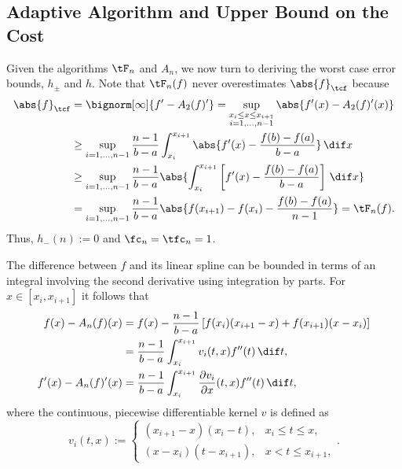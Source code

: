 \documentclass[]{elsarticle}
\theoremstyle{definition}
\theoremstyle{remark}
\newcommand{\Ftnorm}[1]{\abs{#1}_{\tcf}}
\begin{document}
\subsection{Adaptive Algorithm and Upper Bound on the Cost}

Given the algorithms $\tF_n$ and $A_n$, we now turn to deriving the worst case error bounds, $h_{\pm}$  and $h$.
Note that $\tF_{n}(f)$ never overestimates $\Ftnorm{f}$ because
\begin{align*}
\Ftnorm{f} &  = \bignorm[\infty]{f'-A_2(f)'}
= \sup_{\substack{x_i \le x \le x_{i+1}\\ i=1, \ldots, n-1 }} \abs{f'(x) - A_2(f)'(x)} \\
&\ge \sup_{i=1, \ldots, n-1} \frac{n-1}{b-a}\int_{x_i}^{x_{i+1}} \abs{f'(x) - \frac{f(b)-f(a)}{b-a}} \, \dif x \\
&\ge \sup_{i=1, \ldots, n-1} \frac{n-1}{b-a} \abs{\int_{x_i}^{x_{i+1}} \left[f'(x) -\frac{f(b)-f(a)}{b-a}\right] \, \dif x }\\
&= \sup_{i=1, \ldots, n-1} \frac{n-1}{b-a} \abs{f(x_{i+1})-f(x_i) - \frac{f(b)-f(a)}{n-1}} = \tF_n(f).
\end{align*}
Thus, $h_{-}(n):=0$ and $\fc_n=\tfc_n=1$.

The difference between $f$ and its linear spline can be bounded in terms of an integral involving the second derivative using integration by parts.  For $x \in [x_i,x_{i+1}]$ it follows that
\begin{align}
\nonumber
f(x)-A_n (f)(x)
&= f(x) - \frac{n-1}{b-a} \left[f(x_{i})(x_{i+1}-x) +f(x_{i+1})(x-x_i) \right]\\
& = \frac{n-1}{b-a} \int_{x_i}^{x_{i+1}} v_i(t,x) f''(t) \, \dif t, \label{fintermsfdoubprime}\\
f'(x)-A_n(f)'(x) & = \frac{n-1}{b-a} \int_{x_i}^{x_{i+1}} \frac{\partial v_i}{\partial x}(t,x) f''(t) \, \dif t, \label{fprimeintermsfdoubprime}
\end{align}
where the continuous, piecewise differentiable kernel $v$ is defined as
\begin{equation*}
v_i(t,x) :=\begin{cases} (x_{i+1}-x)(x_i-t), & x_i\leq t\leq x,\\
(x-x_{i})(t- x_{i+1}), & x< t \leq x_{i+1},
\end{cases}.
\end{equation*}
\end{document}
